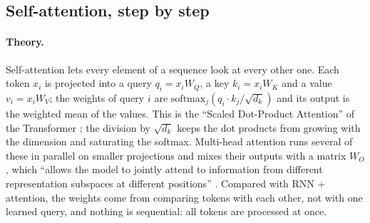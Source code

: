

\subsection{Self-attention, step by step}\label{sec:selfattn}

\paragraph{Theory.} Self-attention lets every element of a sequence look at every other one. Each token
$x_i$ is projected into a query $q_i = x_i W_Q$, a key $k_i = x_i W_K$ and a value $v_i = x_i W_V$; the
weights of query $i$ are $\mathrm{softmax}_j(q_i \cdot k_j / \sqrt{d_k})$ and its output is the weighted
mean of the values. This is the ``Scaled Dot-Product Attention'' of the Transformer
\cite[p.~4]{vaswani2017attention}; the division by $\sqrt{d_k}$ keeps the dot products from growing with the
dimension and saturating the softmax. Multi-head attention runs several of these in parallel on smaller
projections and mixes their outputs with a matrix $W_O$, which ``allows the model to jointly attend to
information from different representation subspaces at different positions''
\cite[p.~5]{vaswani2017attention}. Compared with RNN + attention, the weights come from comparing tokens with
each other, not with one learned query, and nothing is sequential: all tokens are processed at once.

